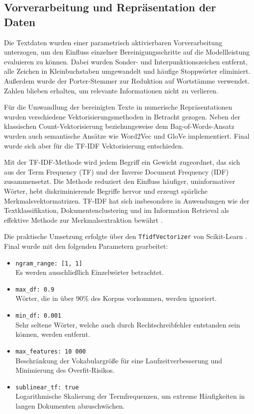 \subsection{Vorverarbeitung und Repräsentation der Daten}
\label{sec:vorverarbeitung}

Die Textdaten wurden einer parametrisch aktivierbaren Vorverarbeitung unterzogen, um den Einfluss einzelner Bereinigungsschritte auf die Modellleistung evaluieren zu können. Dabei wurden Sonder- und Interpunktionszeichen entfernt, alle Zeichen in Kleinbuchstaben umgewandelt und häufige Stoppwörter eliminiert. Außerdem wurde der Porter-Stemmer \cite{porter_algorithm_2006} zur Reduktion auf Wortstämme verwendet. Zahlen blieben erhalten, um relevante Informationen nicht zu verlieren.

Für die Umwandlung der bereinigten Texte in numerische Repräsentationen wurden verschiedene Vektorisierungsmethoden in Betracht gezogen. Neben der klassischen Count-Vektorisierung beziehungsweise dem Bag-of-Words-Ansatz wurden auch semantische Ansätze wie Word2Vec \cite{mikolov_efficient_2013} und GloVe \cite{pennington_glove_2014} implementiert. Final wurde sich aber für die TF-IDF Vektorisierung entschieden.

Mit der TF-IDF-Methode wird jedem Begriff ein Gewicht zugeordnet, das sich aus der Term Frequency (TF) und der Inverse Document Frequency (IDF) zusammensetzt. Die Methode reduziert den Einfluss häufiger, uninformativer Wörter, hebt diskriminierende Begriffe hervor und erzeugt spärliche Merkmalsvektormatrizen. TF-IDF hat sich insbesondere in Anwendungen wie der Textklassifikation, Dokumentenclustering und im Information Retrieval als effektive Methode zur Merkmalsextraktion bewährt \cite{manning_introduction_2008}.

Die praktische Umsetzung erfolgte über den \texttt{TfidfVectorizer} von Scikit-Learn \cite{skicitLearnRef}. Final wurde mit den folgenden Parametern gearbeitet:
\begin{itemize}
    \item \texttt{ngram\_range: [1, 1]} \\ Es werden ausschließlich Einzelwörter betrachtet.
    \item \texttt{max\_df: 0.9} \\ Wörter, die in über 90\% des Korpus vorkommen, werden ignoriert.
    \item \texttt{min\_df: 0.001} \\ Sehr seltene Wörter, welche auch durch Rechtschreibfehler entstanden sein können, werden entfernt.
    \item \texttt{max\_features: 10\,000} \\ Beschränkung der Vokabulargröße für eine Laufzeitverbesserung und Minimierung des Overfit-Risikos.
    \item \texttt{sublinear\_tf: true} \\ Logarithmische Skalierung der Termfrequenzen, um extreme Häufigkeiten in langen Dokumenten abzuschwächen.
\end{itemize}
